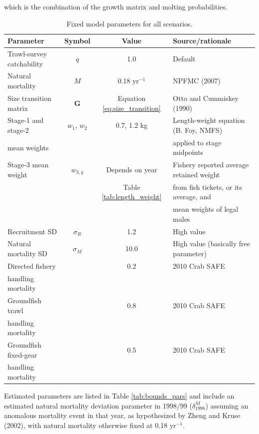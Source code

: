 \documentclass[]{article}
\begin{document}
which is the combination of the growth matrix and molting probabilities.

\begin{table}[ht]
\centering
\caption{Fixed model parameters for all scenarios.} 
\label{tab:fixed_pars}
\begin{tabular}{lccl}
  \hline
  Parameter & Symbol & Value & Source/rationale \\
  \hline
  Trawl-survey catchability & $q$ & 1.0 & Default \\
  Natural mortality & $M$ & 0.18 $\text{yr}^{-1}$ & NPFMC (2007) \\
  Size transition matrix & $\boldsymbol{G}$ & Equation \ref{eq:size_transition} & Otto and Cummiskey (1990) \\
  Stage-1 and stage-2 & $w_{1}$, $w_{2}$ & 0.7, 1.2 kg & Length-weight equation (B. Foy, NMFS) \\
  mean weights & & & applied to stage midpoints \\
  Stage-3 mean weight & $w_{3,y}$ & Depends on year & Fishery reported average retained weight \\
  & & Table \ref{tab:length_weight} & from fish tickets, or its average, and \\
  & & & mean weights of legal males \\
  Recruitment SD & $\sigma_R$ & 1.2 & High value \\
  Natural mortality SD & $\sigma_M$ & 10.0 & High value (basically free parameter) \\
  Directed fishery & & 0.2 & 2010 Crab SAFE \\
  handling mortality & & & \\
  Groundfish trawl & & 0.8 & 2010 Crab SAFE \\
  handling mortality & & & \\
  Groundfish fixed-gear & & 0.5 & 2010 Crab SAFE \\
  handling mortality & & & \\
  \hline
\end{tabular}
\end{table}

Estimated parameters are listed in Table \ref{tab:bounds_pars} and
include an estimated natural mortality deviation parameter in 1998/99
(\(\delta^M_{1998}\)) assuming an anomalous mortality event in that
year, as hypothesized by Zheng and Kruse (2002), with natural mortality
otherwise fixed at 0.18 \(\text{yr}^{-1}\).
\end{document}
